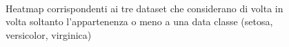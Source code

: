 \documentclass[oneside, openany]{book}
\begin{document}
	\begin{figure}[h]
		\quad 
		\quad
		\\
		\caption{Heatmap corrispondenti ai tre dataset che considerano di volta in volta soltanto l'appartenenza o meno a una data classe (setosa, versicolor, virginica)}
		\label{fig:hm}
	\end{figure}
\end{document}
